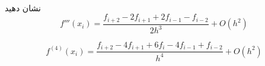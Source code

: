 \\
نشان دهید
\[ f'''(x_i) = \frac{{f_{i+2} - 2f_{i+1} + 2f_{i-1} - f_{i-2}}}{{2h^3}} + O(h^2) \]

\[ f^{(4)}(x_i) = \frac{{f_{i+2} - 4f_{i+1} + 6f_i - 4f_{i-1} + f_{i-2}}}{{h^4}} + O(h^2) \]
